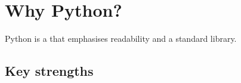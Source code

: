 \documentclass[a4paper,11pt,english]{sphinxmanual}
\begin{document}
\sphinxstepscope


\section{Why Python?}
\label{\detokenize{getting_started/why_python:why-python}}\label{\detokenize{getting_started/why_python::doc}}
\sphinxAtStartPar
Python is a  that emphasises readability and a  standard library.


\subsection{Key strengths}
\label{\detokenize{getting_started/why_python:key-strengths}}
\end{document}
